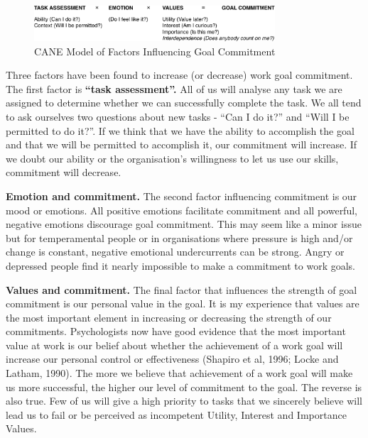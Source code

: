 \begin{figure}[b]
	\centering
	\includegraphics[width=0.8\textwidth]{resources/goal-commitment.pdf}
	\caption[CANE Model of Factors Influencing Goal Commitment]{CANE Model of Factors Influencing Goal Commitment}
\end{figure}

Three factors have been found to increase (or decrease) work goal commitment. The first factor is {\bf ``task assessment''.} All of us will analyse any task we are assigned to determine whether we can successfully complete the task. We all tend to ask ourselves two questions about new tasks - ``Can I do it?'' and “Will I be permitted to do it?”. If we think that we have the ability to accomplish the goal and that we will be permitted to accomplish it, our commitment will increase. If we doubt our ability or the organisation’s willingness to let us use our skills, commitment will decrease.

{\bf Emotion and commitment.} The second factor influencing commitment is our mood or emotions. All positive emotions facilitate commitment and all powerful, negative emotions discourage goal commitment. This may seem like a minor issue but for temperamental people or in organisations where pressure is high and/or change is constant, negative emotional undercurrents can be strong. Angry or depressed people find it nearly impossible to make a commitment to work goals.

{\bf Values and commitment.} The final factor that influences the strength of goal commitment is our personal value in the goal. It is my experience that values are the most important element in increasing or decreasing the strength of our commitments. Psychologists now have good evidence that the most important value at work is our belief about whether the achievement of a work goal will increase our personal control or effectiveness (Shapiro et al, 1996; Locke and Latham, 1990). The more we believe that achievement of a work goal will make us more successful, the higher our level of commitment to the goal. The reverse is also true. Few of us will give a high priority to tasks that we sincerely believe will lead us to fail or be perceived as incompetent Utility, Interest and Importance Values.


